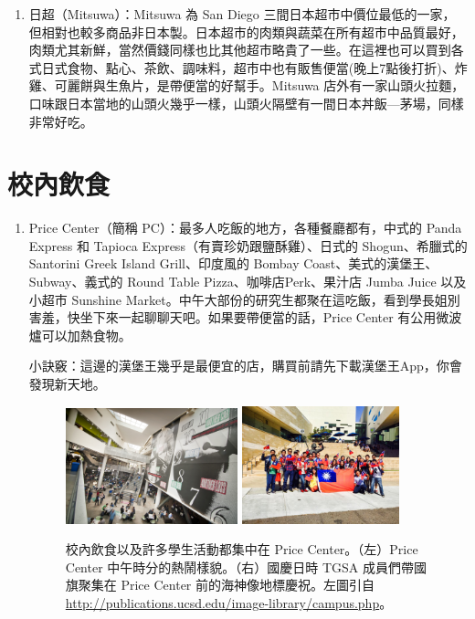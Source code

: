 \documentclass[10pt,a4paper]{book}
\begin{document}
\begin{CJK}{UTF8}{bkai}
\begin{enumerate}
\begin{enumerate}
\item 日超（Mitsuwa）：Mitsuwa 為 San Diego 三間日本超市中價位最低的一家，但相對也較多商品非日本製。日本超市的肉類與蔬菜在所有超市中品質最好，肉類尤其新鮮，當然價錢同樣也比其他超市略貴了一些。在這裡也可以買到各式日式食物、點心、茶飲、調味料，超市中也有販售便當(晚上7點後打折)、炸雞、可麗餅與生魚片，是帶便當的好幫手。Mitsuwa 店外有一家山頭火拉麵，口味跟日本當地的山頭火幾乎一樣，山頭火隔壁有一間日本丼飯---茅場，同樣非常好吃。
\end{enumerate}
\end{enumerate}

\section{校內飲食}

\begin{enumerate}
\item Price Center（簡稱 PC）：最多人吃飯的地方，各種餐廳都有，中式的 Panda Express 和 Tapioca Express（有賣珍奶跟鹽酥雞）、日式的 Shogun、希臘式的 Santorini Greek Island Grill、印度風的 Bombay Coast、美式的漢堡王、 Subway、義式的 Round Table Pizza、咖啡店Perk、果汁店 Jumba Juice 以及小超市 Sunshine Market。中午大部份的研究生都聚在這吃飯，看到學長姐別害羞，快坐下來一起聊聊天吧。如果要帶便當的話，Price Center 有公用微波爐可以加熱食物。

小訣竅：這邊的漢堡王幾乎是最便宜的店，購買前請先下載漢堡王App，你會發現新天地。

\begin{figure}
\centering
\includegraphics[width=0.47\textwidth]{Pics/pc-min}
\includegraphics[width=0.43\textwidth]{Pics/pctriton1-min}
\caption{校內飲食以及許多學生活動都集中在 Price Center。（左）Price Center 中午時分的熱鬧樣貌。（右）國慶日時 TGSA 成員們帶國旗聚集在 Price Center 前的海神像地標慶祝。左圖引自\url{http://publications.ucsd.edu/image-library/campus.php}。}
\end{figure}


\end{enumerate}
\end{CJK}
\end{document}
